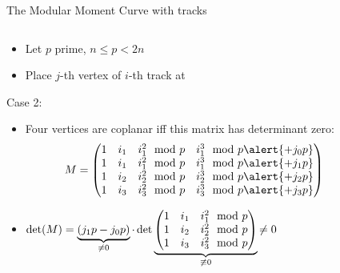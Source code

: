 \documentclass[t]{beamer}
\begin{document}
\begin{frame}{The Modular Moment Curve with tracks}
    \vspace{-0.5cm}
    \begin{columns}
	\begin{column}{0.5\textwidth}
		\begin{itemize}
		    \item <+-> Let $p$ prime, $n\le p<2n$
		    \item
			Place $j$-th vertex of $i$-th track at  \\
			\end{itemize}
			Case 2: 
			\begin{itemize}
		    \item Four vertices are coplanar iff this matrix has determinant zero:
			\begin{equation*}
			    M = \begin{pmatrix}
				{1}&i_1&i_1^2\mod p&i_1^3\mod p \alert{+j_0p}\\
				{1}&i_1&i_1^2\mod p&i_1^3\mod p \alert{+j_1p}\\
				{1}&i_2&i_2^2\mod p&i_2^3\mod p \alert{+j_2p}\\
				{1}&i_3&i_3^2\mod p&i_3^3\mod p \alert{+j_3p}\\
			    \end{pmatrix}
			\end{equation*}
		    \item <+-> 
			\(\det(M) = \underbrace{(j_1p-j_0p)}_{\neq 0}\cdot\det
			    \underbrace{
				\begin{pmatrix}
				    {1}&i_1&i_1^2\mod p\\
				    {1}&i_2&i_2^2\mod p\\
				    {1}&i_3&i_3^2\mod p\\
				\end{pmatrix}
			    }_{\not\equiv0} \mathrlap{\neq 0}
			\)
		\end{itemize}
	\end{column}
	    \begin{column}{0.5\textwidth}
		\begin{center}
		\end{center}
	    \end{column}
    \end{columns}
\end{frame}
\end{document}
